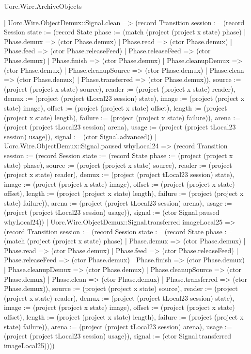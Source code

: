 \begin{lexlean}{Uorc.Wire.ArchiveObjects}
\begin{semanticmodule}
{          | Uorc.Wire.ObjectDemux::Signal.clean => (record Transition {session := (record Session {state := (record State {phase := (match (project (project x state) phase)
            | Phase.demux => (ctor Phase.demux)
            | Phase.read => (ctor Phase.demux)
            | Phase.feed => (ctor Phase.releaseFeed)
            | Phase.releaseFeed => (ctor Phase.demux)
            | Phase.finish => (ctor Phase.demux)
            | Phase.cleanupDemux => (ctor Phase.demux)
            | Phase.cleanupSource => (ctor Phase.demux)
            | Phase.clean => (ctor Phase.demux)
            | Phase.transferred => (ctor Phase.demux)), source := (project (project x state) source), reader := (project (project x state) reader), demux := (project (project tLocal23 session) state), image := (project (project x state) image), offset := (project (project x state) offset), length := (project (project x state) length), failure := (project (project x state) failure)}), arena := (project (project tLocal23 session) arena), usage := (project (project tLocal23 session) usage)}), signal := (ctor Signal.advanced)})
          | Uorc.Wire.ObjectDemux::Signal.paused whyLocal24 => (record Transition {session := (record Session {state := (record State {phase := (project (project x state) phase), source := (project (project x state) source), reader := (project (project x state) reader), demux := (project (project tLocal23 session) state), image := (project (project x state) image), offset := (project (project x state) offset), length := (project (project x state) length), failure := (project (project x state) failure)}), arena := (project (project tLocal23 session) arena), usage := (project (project tLocal23 session) usage)}), signal := (ctor Signal.paused whyLocal24)})
          | Uorc.Wire.ObjectDemux::Signal.transferred imageLocal25 => (record Transition {session := (record Session {state := (record State {phase := (match (project (project x state) phase)
            | Phase.demux => (ctor Phase.demux)
            | Phase.read => (ctor Phase.demux)
            | Phase.feed => (ctor Phase.releaseFeed)
            | Phase.releaseFeed => (ctor Phase.demux)
            | Phase.finish => (ctor Phase.demux)
            | Phase.cleanupDemux => (ctor Phase.demux)
            | Phase.cleanupSource => (ctor Phase.demux)
            | Phase.clean => (ctor Phase.demux)
            | Phase.transferred => (ctor Phase.demux)), source := (project (project x state) source), reader := (project (project x state) reader), demux := (project (project tLocal23 session) state), image := (project (project x state) image), offset := (project (project x state) offset), length := (project (project x state) length), failure := (project (project x state) failure)}), arena := (project (project tLocal23 session) arena), usage := (project (project tLocal23 session) usage)}), signal := (ctor Signal.transferred imageLocal25)})))
}
\end{semanticmodule}
\end{lexlean}
